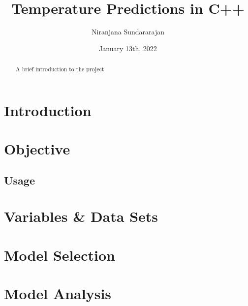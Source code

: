 \documentclass[]{article}   %
\begin{document}
\twocolumn
\title{Temperature Predictions in C++}   %
\author{Niranjana Sundararajan}         %
\date{January 13th, 2022}    %
\maketitle

\begin{abstract}
  A brief introduction to the project
\end{abstract}

\tableofcontents
\section{Introduction}  

\section{Objective}     %
\subsection{Usage}         %

\section{Variables \& Data Sets}

\section{Model Selection}

\section{Model Analysis}
\begin{thebibliography}{9}
\end{thebibliography}
\end{document}
